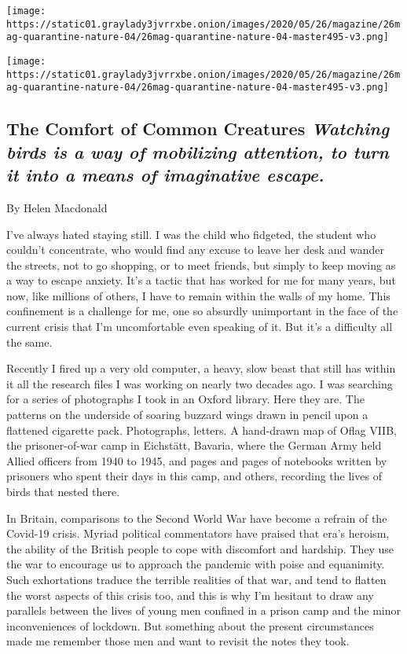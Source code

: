 \texttt{[image: https://static01.graylady3jvrrxbe.onion/images/2020/05/26/magazine/26mag-quarantine-nature-04/26mag-quarantine-nature-04-master495-v3.png]}

\texttt{[image: https://static01.graylady3jvrrxbe.onion/images/2020/05/26/magazine/26mag-quarantine-nature-04/26mag-quarantine-nature-04-master495-v3.png]}

\hypertarget{the-comfort-of-common-creatures-watching-birds-is-a-way-of-mobilizing-attention-to-turn-it-into-a-means-of-imaginative-escape}{%
\subsection{\texorpdfstring{The Comfort of Common Creatures
\emph{Watching birds is a way of mobilizing attention, to turn it into a
means of imaginative
escape.}}{The Comfort of Common Creatures Watching birds is a way of mobilizing attention, to turn it into a means of imaginative escape.}}\label{the-comfort-of-common-creatures-watching-birds-is-a-way-of-mobilizing-attention-to-turn-it-into-a-means-of-imaginative-escape}}

By Helen Macdonald

I've always hated staying still. I was the child who fidgeted, the
student who couldn't concentrate, who would find any excuse to leave her
desk and wander the streets, not to go shopping, or to meet friends, but
simply to keep moving as a way to escape anxiety. It's a tactic that has
worked for me for many years, but now, like millions of others, I have
to remain within the walls of my home. This confinement is a challenge
for me, one so absurdly unimportant in the face of the current crisis
that I'm uncomfortable even speaking of it. But it's a difficulty all
the same.

Recently I fired up a very old computer, a heavy, slow beast that still
has within it all the research files I was working on nearly two decades
ago. I was searching for a series of photographs I took in an Oxford
library. Here they are. The patterns on the underside of soaring buzzard
wings drawn in pencil upon a flattened cigarette pack. Photographs,
letters. A hand-drawn map of Oflag VIIB, the prisoner-of-war camp in
Eichstätt, Bavaria, where the German Army held Allied officers from 1940
to 1945, and pages and pages of notebooks written by prisoners who spent
their days in this camp, and others, recording the lives of birds that
nested there.

In Britain, comparisons to the Second World War have become a refrain of
the Covid-19 crisis. Myriad political commentators have praised that
era's heroism, the ability of the British people to cope with discomfort
and hardship. They use the war to encourage us to approach the pandemic
with poise and equanimity. Such exhortations traduce the terrible
realities of that war, and tend to flatten the worst aspects of this
crisis too, and this is why I'm hesitant to draw any parallels between
the lives of young men confined in a prison camp and the minor
inconveniences of lockdown. But something about the present
circumstances made me remember those men and want to revisit the notes
they took.


